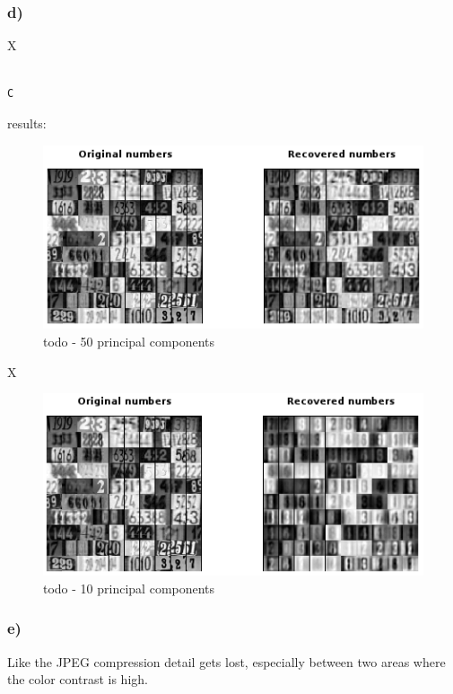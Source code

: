 \subsubsection{d)}

X

\begin{lstlisting}[caption=todo]

C

\end{lstlisting}


results:


\begin{figure}[!ht]
\includegraphics[width=1\textwidth]{chapters/images/figure-3-7-d1}
\caption{todo - 50 principal components}
\end{figure}

X



\begin{figure}[!ht]
\includegraphics[width=1\textwidth]{chapters/images/figure-3-7-d2}
\caption{todo - 10 principal components}
\end{figure}




\subsubsection{e)}

Like the JPEG compression detail gets lost, especially between two areas where the color contrast is high.
